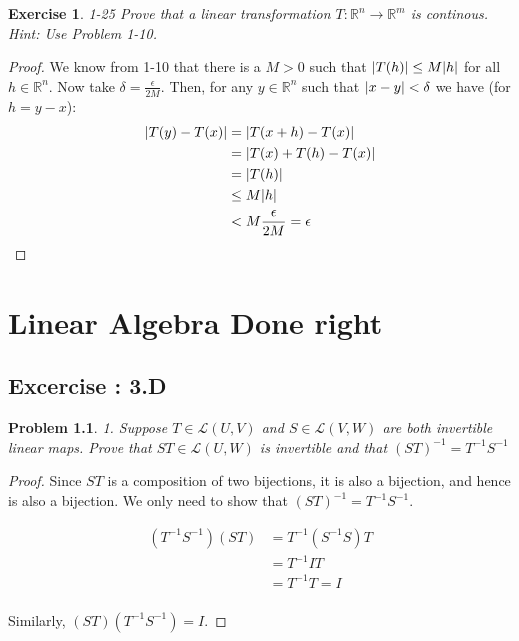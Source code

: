 \documentclass[12pt]{book}
\newtheorem*{problem*}{Problem}
\newtheorem*{exercise*}{Exercise}
\newcommand{\LL}{\mathcal{L}}
\begin{document}
\begin{exercise*}
  1-25 Prove that a linear transformation $T : \mathbb{R}^n \to \mathbb{R}^m$ is continous. Hint: Use Problem 1-10.
\end{exercise*}

\begin{proof}
  We know from 1-10 that there is a $M > 0$ such that $\abs{T(h)} \le M\abs{h}$ for all $h \in \mathbb{R}^n$. Now take $\delta = \frac{\epsilon}{2M}$. Then, for any $y \in \mathbb{R}^n$ such that $\abs{x -y } < \delta$ we have (for $h = y-x$):
  \begin{align*}
    \abs{T(y) - T(x)} &= \abs{T(x+h) - T(x)}\\
    &= \abs{T(x) + T(h) - T(x)} \\
    &= \abs{T(h)}\\
    & \le M\abs{h}\\
    & < M \frac{\epsilon}{2M} = \epsilon
  \end{align*}
\end{proof}

%

\chapter{Linear Algebra Done right}

\section{Excercise : 3.D}

\begin{problem*}
  1. Suppose $T \in \LL(U,V)$ and $ S \in \LL(V,W)$ are both invertible
  linear maps. Prove that $ST \in \LL(U,W)$ is invertible and that $(ST)^{-1} = T^{-1}S^{-1}$
\end{problem*}

\begin{proof}
  Since $ST$ is a composition of two bijections, it is also a bijection, and hence is also a bijection. We only need to show that $(ST)^{-1} = T^{-1}S^{-1}$.

  \begin{align*}
    (T^{-1} S^{-1}) (S T) & = T^{-1} (S^{-1} S) T\\
    & = T^{-1} I T\\
    & = T^{-1}T = I \\
  \end{align*}

  Similarly, $(S T) (T^{-1} S^{-1}) = I$.
\end{proof}
\end{document}
